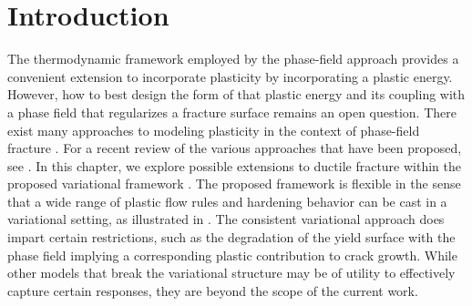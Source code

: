 \section{Introduction}
\label{section: ductile/intro}


The thermodynamic framework employed by the phase-field approach provides a convenient extension to incorporate plasticity by incorporating a plastic energy. However, how to best design the form of that plastic energy and its coupling with a phase field that regularizes a fracture surface remains an open question.
There exist many approaches to modeling plasticity in the context of phase-field fracture \cite{alessi_gradient_2014, alessi_gradient_2015, alessi_coupling_2018, ambati_phase-field_2015, ambati_phase-field_2016, miehe_phase_2016, borden_phase-field_2016, borden_phase-field_2017}.  For a recent review of the various approaches that have been proposed, see  \citet{alessi_comparison_2017}. In this chapter, we explore possible extensions to ductile fracture within the proposed variational framework . The proposed framework is flexible in the sense that a wide range of plastic flow rules and hardening behavior can be cast in a variational setting, as illustrated in \cite{ortiz_variational_1999}.  The consistent variational approach does impart certain restrictions, such as the degradation of the yield surface with the phase field implying a corresponding plastic contribution to crack growth.  While other models that break the variational structure may be of utility to effectively capture certain responses, they are beyond the scope of the current work.


